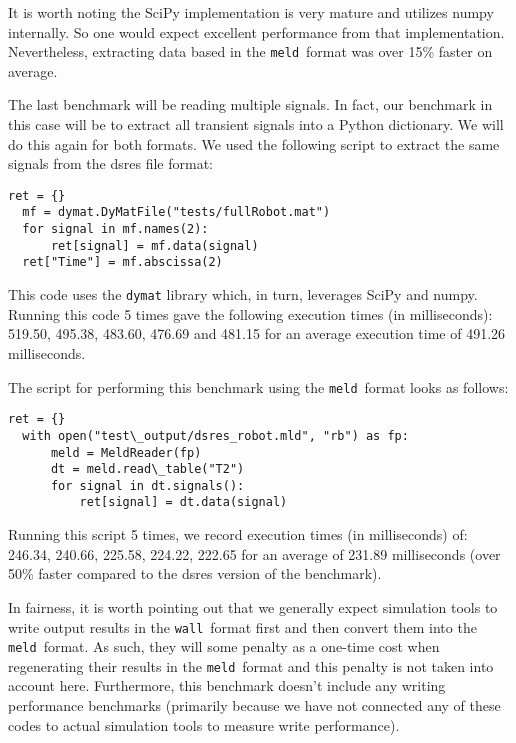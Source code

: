 \documentclass[11pt,a4paper,onecolumn]{article}
\newcommand{\wall}{\texttt{wall}}
\newcommand{\meld}{\texttt{meld}}
\newcommand{\code}[1]{\texttt{#1}} %
\begin{document}
It is worth noting the SciPy implementation is very mature and
utilizes numpy internally.  So one would expect excellent performance
from that implementation.  Nevertheless, extracting data based in the
\meld\ format was over 15\% faster on average.


The last benchmark will be reading multiple signals.  In fact, our
benchmark in this case will be to extract all transient signals into a
Python dictionary.  We will do this again for both formats.  We used
the following script to extract the same signals from the dsres file
format:

\lstset{language=python}
\begin{lstlisting}[frame=single]
  ret = {}
  mf = dymat.DyMatFile("tests/fullRobot.mat")
  for signal in mf.names(2):
      ret[signal] = mf.data(signal)
  ret["Time"] = mf.abscissa(2)
\end{lstlisting}

This code uses the \code{dymat} library which, in turn, leverages
SciPy and numpy.  Running this code 5 times gave the following
execution times (in milliseconds): 519.50, 495.38, 483.60, 476.69 and
481.15 for an average execution time of 491.26 milliseconds.

The script for performing this benchmark using the \meld\ format looks
as follows:

\lstset{language=python}
\begin{lstlisting}[frame=single]
  ret = {}
  with open("test\_output/dsres_robot.mld", "rb") as fp:
      meld = MeldReader(fp)
      dt = meld.read\_table("T2")
      for signal in dt.signals():
          ret[signal] = dt.data(signal)
\end{lstlisting}

Running this script 5 times, we record execution times (in
milliseconds) of: 246.34, 240.66, 225.58, 224.22, 222.65 for an
average of 231.89 milliseconds (over 50\% faster compared to the dsres
version of the benchmark).

In fairness, it is worth pointing out that we generally expect
simulation tools to write output results in the \wall\ format first
and then convert them into the \meld\ format.  As such, they will some
penalty as a one-time cost when regenerating their results in the
\meld\ format and this penalty is not taken into account here.
Furthermore, this benchmark doesn't include any writing performance
benchmarks (primarily because we have not connected any of these codes
to actual simulation tools to measure write performance).
\end{document}

